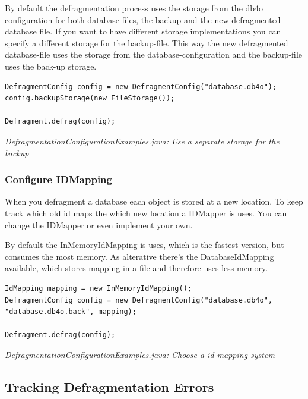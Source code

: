 By default the defragmentation process uses the storage from the db4o configuration for both database files, the backup and the new defragmented database file. If you want to have different storage implementations you can specify a different storage for the backup-file. This way the new defragmented database-file uses the storage from the database-configuration and the backup-file uses the back-up storage.

\begin{lstlisting}
DefragmentConfig config = new DefragmentConfig("database.db4o");
config.backupStorage(new FileStorage());

Defragment.defrag(config);
\end{lstlisting}

{\small\itshape DefragmentationConfigurationExamples.java: Use a separate storage for the backup\par}
\medskip

\subsubsection{Configure IDMapping}
\label{ref:advanced-topics-defragment-configuration-id-mapping}

When you defragment a database each object is stored at a new location. To keep track which old id maps the which new location a IDMapper is uses. You can change the IDMapper or even implement your own.

By default the InMemoryIdMapping is uses, which is the fastest version, but consumes the most memory. As alterative there's the DatabaseIdMapping available, which stores mapping in a file and therefore uses less memory.

\begin{lstlisting}
IdMapping mapping = new InMemoryIdMapping();
DefragmentConfig config = new DefragmentConfig("database.db4o", "database.db4o.back", mapping);

Defragment.defrag(config);
\end{lstlisting}

{\small\itshape DefragmentationConfigurationExamples.java: Choose a id mapping system\par}
\medskip

\subsection{Tracking Defragmentation Errors}
\label{ref:advanced-topics-defragment-tracking-defragmentation-errors}


